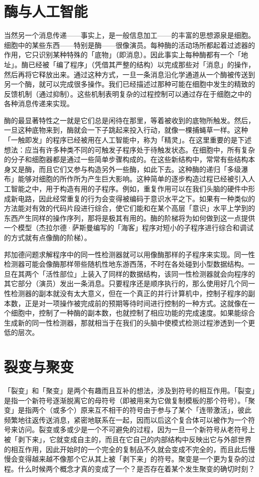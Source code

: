 \documentclass[
  12pt,
  twoside,
  openright,
  oldfontcommands,
]{memoir}
\begin{document}
\section{酶与人工智能}

当然另一个消息传递------事实上，是一般信息加工------的丰富的思想源泉是细胞。细胞中的某些东西------特别是酶------很像演员。每种酶的活动场所都起着过滤器的作用，它只识别某种特殊的「底物」（即消息）。因此事实上每种酶都有一个「地址」。酶已经被「编了程序」（凭借其严整的结构）以完成那些对「消息」的操作，然后再将它释放出来。通过这种方式，一旦一条消息沿化学通道从一个酶被传送到另一个酶，就可以完成很多操作。我们已经描述过那种可能在细胞中发生的精致的反馈机制（通过抑制）。这些机制表明复杂的过程控制可以通过存在于细胞之中的各种消息传递来实现。

酶的最显著特性之一就是它们总是闲待在那里，等着被收到的底物所触发。然后，一旦这种底物来到，酶就会一下子跳起来投入行动，就像一棵捕蝇草一样。这种「一触即发」的程序已经被用在人工智能中，称为「精灵」。在这里重要的是下述想法：应当有许多种类不同的可触发子程序处于待触发状态。在细胞中，所有复杂的分子和细胞器都是通过一些简单步骤构成的。在这些新结构中，常常有些结构本身又是酶，而且它们又参与构造另外一些酶，如此下去。这种酶的递归「多级瀑布」能够对细胞的所作所为产生巨大影响。这种简单的逐步构造过程已经被引入人工智能之中，用于构造有用的子程序。例如，重复作用可以在我们头脑的硬件中形成新电路，因此经常重复的行为会变得被编码于意识水平之下。如果有一种类似的方法能对有效的代码片段进行综合，使它们能和在某个高层「意识」水平上学到的东西产生同样的操作序列，那将是极其有用的。酶的阶梯将为如何做到这一点提供一个模型（杰拉尔德·萨斯曼编写的「海客」程序对短小的子程序进行综合和调试的方式就有点像酶的阶梯）。

邦加德问题求解程序中的同一性检测器就可以用像酶那样的子程序来实现。同一性检测器可能会像酶那样带些随机性地东游西荡，不时在各处碰到小型数据结构。一旦在其两个「活性部位」上装入了同样的数据结构，该同一性检测器就会向程序的其它部分（演员）发出一条消息。只要程序还是顺序执行的，那么使用好几个同一性检测器的副本就没有太大意义，但在一个真正的并行计算机中，控制子程序的副本数，正是对一项操作被完成前的预期等待时间进行控制的一种方式。这就像在一个细胞中，控制了一种酶的副本数，也就控制了相应功能的完成速度。如果能综合生成新的同一性检测器，那就相当于在我们的头脑中使模式检测过程渗透到一个更低的层次。

\section{裂变与聚变}

「裂变」和「聚变」是两个有趣而且互补的想法，涉及到符号的相互作用。「裂变」是指一个新符号逐渐脱离它的母符号（即被用来为它做复制模板的那个符号）。「聚变」是指两个（或多个）原来互不相干的符号由于参与了某个「连带激活」，彼此频繁地往返传送消息，紧密地联系在一起，因而以后这个复合体可以被作为一个符号来访问。裂变或多或少是一个不可避免的过程，因为一旦一个新符号从老符号上被「剥下来」，它就变成自主的，而且在它自己的内部结构中反映出它与外部世界的相互作用，因此开始时的一个完全的复制品不久就会变成不完全的，而且此后慢慢会变得越来越不像那个它从其上被「剥下来」的符号。聚变是一个更为复杂的过程。什么时候两个概念才真的变成了一个？是否存在着某个发生聚变的确切时刻？
\end{document}
